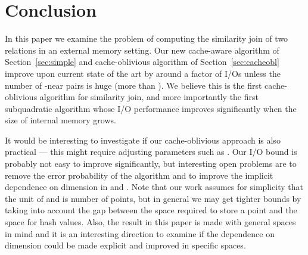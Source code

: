 \documentclass{llncs}
\begin{document}
\section{Conclusion}\label{sec:concl}
In this paper we examine the problem of computing the similarity join of two relations in an external memory setting. 
Our new cache-aware algorithm of Section~\ref{sec:simple} and cache-oblivious algorithm of Section~\ref{sec:cacheobl} improve upon current state of the art by around a factor of  I/Os unless the number of -near pairs is huge (more than ).
We believe this is the first cache-oblivious algorithm for similarity join, and more importantly the first subquadratic algorithm whose I/O performance improves significantly when the size of internal memory grows.


It would be interesting to investigate if our cache-oblivious approach is also practical --- this might require adjusting parameters such as .
Our I/O bound is probably not easy to improve significantly, but interesting open problems are to remove the error probability of the algorithm and to improve the implicit dependence on dimension in  and . Note that our work assumes for simplicity that the unit of  and  is number of points, but in general we may get tighter bounds by taking into account the gap between the space required to store a point and the space for hash values.
Also, the result in this paper is made with general spaces in mind and it is an interesting direction to examine if the dependence on dimension could be made explicit and improved in specific spaces.




\end{document}
